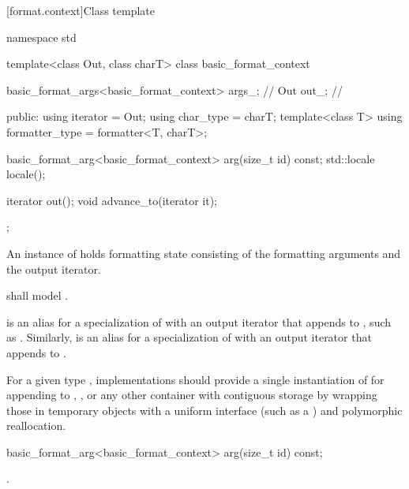 [format.context]{Class template }

%
%
%
%
\begin{codeblock}
namespace std {
  template<class Out, class charT>
  class basic_format_context {
    basic_format_args<basic_format_context> args_;      // \expos
    Out out_;                                           // \expos

  public:
    using iterator = Out;
    using char_type = charT;
    template<class T> using formatter_type = formatter<T, charT>;

    basic_format_arg<basic_format_context> arg(size_t id) const;
    std::locale locale();

    iterator out();
    void advance_to(iterator it);
  };
}
\end{codeblock}

\pnum
An instance of  holds formatting state
consisting of the formatting arguments and the output iterator.

\pnum
{} shall model .

\pnum
{}%
 is an alias for
a specialization of 
with an output iterator
that appends to ,
such as .
%
Similarly,  is an alias for
a specialization of 
with an output iterator
that appends to .

\pnum
\recommended
For a given type ,
implementations should provide
a single instantiation of 
for appending to
,
,
or any other container with contiguous storage
by wrapping those in temporary objects with a uniform interface
(such as a ) and polymorphic reallocation.

%
\begin{itemdecl}
basic_format_arg<basic_format_context> arg(size_t id) const;
\end{itemdecl}

\begin{itemdescr}
\pnum
\returns
{}.
\end{itemdescr}

